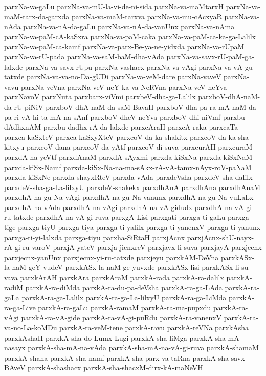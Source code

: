 {parxNa-va-gaLu
parxNa-va-mU-la-vi-de-ni-sida
parxNa-va-maMtarxH
parxNa-va-maM-tarx-da-garxda
parxNa-va-maM-tarxva
parxNa-va-mu-cAcxyaR
parxNa-va-nAda
parxNa-va-nA-da-gaLu
parxNa-va-nA-da-vanUnx
parxNa-va-nAma
parxNa-va-paM-cA-kaSxra
parxNa-va-paM-caka
parxNa-va-paM-ca-ka-ga-Lalilx
parxNa-va-paM-ca-kamf
parxNa-va-parx-Be-ya-ne-yidxda
parxNa-va-rUpaM
parxNa-va-rU-pada
parxNa-va-saM-baM-dha-vAda
parxNa-va-savx-rU-paM-ga-lalxde
parxNa-va-savx-rUpu
parxNa-vashacx
parxNa-va-vAgi
parxNa-va-vA-gu-tatxde
parxNa-va-va-no-Da-gUDi
parxNa-va-veM-dare
parxNa-vaveV
parxNa-vavu
parxNa-veVna
parxNa-veV-neY-ka-va-NeRVna
parxNa-veV-neYva
parxNavoV
parxNuta
parxbarx-viVmi
parxbeV-dha-ga-Lalilx
parxboV-dhA-naM-da-rU-piNiV
parxboV-dhA-naM-da-saM-BavaH
parxboV-dha-pa-ra-mA-naM-da-pa-ri-vA-hi-ta-mA-na-sAnf
parxboV-dheV-neYva
parxboV-dhi-niVmf
parxbu-dAdhxnAM
parxbu-dadhx-rA-da-lalxde
parxcAraH
parxcA-raka
parxcaTa
parxca-kaSxteV
parxca-kaSxyXteV
parxcoV-da-ka-shakitx
parxcoV-da-ka-sha-kitxyu
parxcoV-dana
parxcoV-da-yAtf
parxcoV-di-suva
parxcurAH
parxcuraM
parxdA-ha-yeVtf
parxdAnaM
parxdA-sAyxmi
parxda-kiSxNa
parxda-kiSxNaM
parxda-kiSx-Namf
parxda-kiSx-Na-na-ma-sAkx-rA-vA-tamx-nAyx-roV-paNaM
parxda-kiSxNe
parxda-shayxRteV
parxda-vAda
parxdeVsha
parxdeV-sha-dalilx
parxdeV-sha-ga-La-lilxyU
parxdeV-shakekx
parxdhAnA
parxdhAna
parxdhAnaM
parxdhA-na-gu-Na-vAgi
parxdhA-na-gu-Na-vanunx
parxdhA-na-gu-Na-vuLaLx
parxdhA-na-vAda
parxdhA-na-vAgi
parxdhA-na-vA-gidudx
parxdhA-na-vA-gi-ru-tatxde
parxdhA-na-vA-gi-ruva
parxgA-Lisi
parxgati
parxga-ti-gaLu
parxga-tige
parxga-tiyU
parxga-tiya
parxga-ti-yalilx
parxga-ti-yanenxV
parxga-ti-yanunx
parxga-ti-yi-lalxda
parxga-tiyu
parxha-SiRtaH
parxjAcnx
parxjAcnx-shU-nayx-rA-gi-ru-varoV
parxjA-yateV
parxja-jicnxreV
parxjavx-li-suva
parxjayA
parxjecnx
parxjecnx-yanUnx
parxjecnx-yi-ru-tatxde
parxjeyu
parxkAM-DeVna
parxkASx-la-naM-geY-vudeV
parxkASx-la-naM-ge-yuvxde
parxkASx-lisi
parxkASx-li-su-vava
parxkArAH
parxkAra
parxkAraM
parxkA-rada
parxkA-ra-dalilx
parxkA-radiM
parxkA-ra-diMda
parxkA-ra-du-pa-deVsha
parxkA-ra-ga-LAda
parxkA-ra-gaLa
parxkA-ra-ga-Lalilx
parxkA-ra-ga-La-lilxyU
parxkA-ra-ga-LiMda
parxkA-ra-ga-Live
parxkA-ra-gaLu
parxkA-ramaM
parxkA-ra-ma-pupxdu
parxkA-ra-vAgi
parxkA-ra-vA-gide
parxkA-ra-vA-gi-puRdu
parxkA-ra-vanenxV
parxkA-ra-va-no-La-koMDu
parxkA-ra-veM-tene
parxkA-ravu
parxkA-reVNa
parxkAsha
parxkAshaH
parxkA-sha-do-Lumx-Lugi
parxkA-sha-liMga
parxkA-sha-mA-nasayx
parxkA-sha-mA-na-vAda
parxkA-sha-mA-na-vA-gi-ruva
parxkA-shamaM
parxkA-shana
parxkA-sha-namf
parxkA-sha-parx-va-taRna
parxkA-sha-savx-BAveV
parxkA-shashacx
parxkA-sha-shacxM-dirx-kA-maNeVH
}
